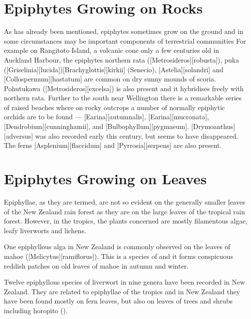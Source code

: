 \section{Epiphytes Growing on Rocks}

As has already been mentioned, epiphytes sometimes grow on the ground and in some circumstances may be important components of terrestrial communities For example on Rangitoto Island, a volcanic cone only a few centuries old in Auckland Harbour, the epiphytes northern rata ([Metrosideros][robusta]), puka ([Griselinia][lucida])[Brachyglottis][kirkii] (Senecio),  [Astelia][solandri] and [Collospermum][hastatum] are common on dry sunny mounds of scoria.
Pohutukawa ([Metrosideros][excelsa]) is also present and it hybridises freely with northern rata.
Further to the south near Wellington there is a remarkable series of raised beaches where on rocky outcrops a number of normally epiphytic orchids are to be found --- [Earina][autumnalis], [Earina][mucronata], [Dendrobium][cunninghamii], and [Bulbophyllum][pygmaeum]. [Drymoanthus][adversus] was also recorded early this century, but seems to have disappeared.
The ferns [Asplenium][flaccidum] and [Pyrrosia][serpens] are also present.

\section{Epiphytes Growing on Leaves}

Epiphyllae, as they are termed, are not so evident on the generally smaller leaves of the New Zealand rain forest as they are on the large leaves of the tropical rain forest.
However, in the tropics, the plants concerned are mostly filamentous algae, leafy liverworts and lichens.

One epiphyllous alga in New Zealand is commonly observed on the leaves of mahoe ([Melicytus][ramiflorus]).
This is a species of  and it forms conspicuous reddish patches on old leaves of mahoe in autumn and winter.

Twelve epiphyllous species of liverwort in nine genera have been recorded in New Zealand.
They are related to epiphyllae of the tropics and in New Zealand they have been found mostly on fern leaves, but also on leaves of trees and shrubs including horopito ().

